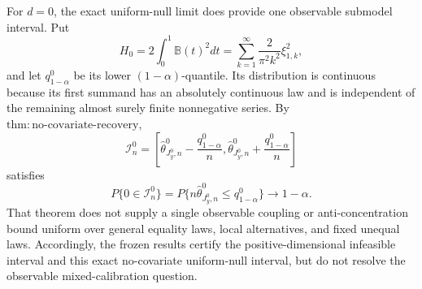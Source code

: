 For \(d=0\), the exact uniform-null limit does provide one observable submodel interval.  Put
\[
H_0=2\int_0^1\mathbb B(t)^2dt
=\sum_{k=1}^{\infty}\frac{2}{\pi^2k^2}\xi_{1,k}^2,
\]
and let \(q^0_{1-\alpha}\) be its lower \((1-\alpha)\)-quantile.  Its distribution is continuous because its first summand has an absolutely continuous law and is independent of the remaining almost surely finite nonnegative series.  By
\(\mathrm{thm{:}no\text{-}covariate\text{-}recovery}\),
\[
\mathcal I_n^0=
\left[\widehat\theta^0_{J_y^0,n}-\frac{q^0_{1-\alpha}}n,
\widehat\theta^0_{J_y^0,n}+\frac{q^0_{1-\alpha}}n\right]
\]
satisfies
\[
P\{0\in\mathcal I_n^0\}
=P\{n\widehat\theta^0_{J_y^0,n}\le q^0_{1-\alpha}\}
\longrightarrow1-\alpha.
\]
That theorem does not supply a single observable coupling or anti-concentration bound uniform over general equality laws, local alternatives, and fixed unequal laws.  Accordingly, the frozen results certify the positive-dimensional infeasible interval and this exact no-covariate uniform-null interval, but do not resolve the observable mixed-calibration question.